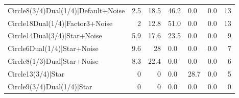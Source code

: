 \begin{tabular}{lrrlllr}
 Circle8(3/4)Dual(1/4)|Default+Noise  &          2.5 &           18.5 & 46.2           & 0.0            & 0.0            &           13 \\
 Circle18Dual(1/4)|Factor3+Noise      &          2   &           12.8 & 51.0           & 0.0            & 0.0            &           13 \\
 Circle14Dual(3/4)|Star+Noise         &          5.9 &           17.6 & 23.5           & 0.0            & 0.0            &            9 \\
 Circle6Dual(1/4)|Star+Noise          &          9.6 &           28   & 0.0            & 0.0            & 0.0            &            7 \\
 Circle8(1/3)Dual|Star+Noise          &          8.3 &           22.4 & 0.0            & 0.0            & 0.0            &            6 \\
 Circle13(3/4)|Star                   &          0   &            0   & 0.0            & 28.7           & 0.0            &            5 \\
 Circle9(3/4)Dual(1/4)|Star           &          0   &            0   & 0.0            & 0.0            & 0.0            &            0 \\
\hline
\end{tabular}